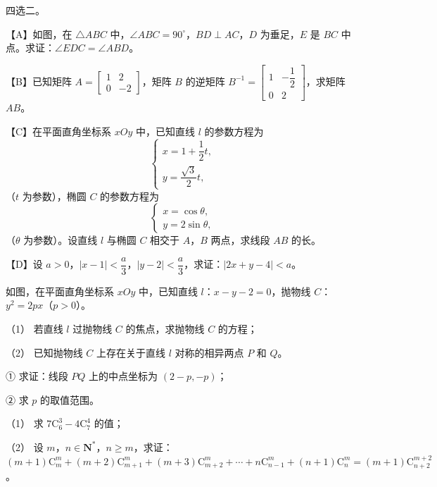 \begin{question}
四选二。

【A】如图，在 \(\triangle ABC\) 中，\(\angle ABC=90^{\circ}\)，\(BD\perp AC\)，\(D\) 为垂足，\(E\) 是 \(BC\) 中点。求证：\(\angle EDC=\angle ABD\)。
\nopagebreak[4]
\begin{center}\end{center}
\nopagebreak[4]
【B】已知矩阵 $A=\begin{bmatrix}1&2\\0&-2\end{bmatrix}$，矩阵 \(B\) 的逆矩阵 $B^{-1}=\begin{bmatrix}1&-\dfrac{1}{2}\\0&2\end{bmatrix}$，求矩阵 \(AB\)。

【C】在平面直角坐标系 \(xOy\) 中，已知直线 \(l\) 的参数方程为
\nopagebreak[4]
\[
\begin{cases}
x=1+\dfrac{1}{2}t,\\
y=\dfrac{\sqrt{3}}{2}t,
\end{cases}
\]
（\(t\) 为参数），椭圆 \(C\) 的参数方程为
\nopagebreak[4]
\[
\begin{cases}
x=\cos\theta,\\
y=2\sin\theta,
\end{cases}
\]
（\(\theta\) 为参数）。设直线 \(l\) 与椭圆 \(C\) 相交于 \(A\)，\(B\) 两点，求线段 \(AB\) 的长。

【D】设 \(a>0\)，\(|x-1|<\dfrac{a}{3}\)，\(|y-2|<\dfrac{a}{3}\)，求证：\(|2x+y-4|<a\)。

\Needspace{0.4\textheight}
\end{question}
\begin{question}
如图，在平面直角坐标系 \(xOy\) 中，已知直线 \(l\)：\(x-y-2=0\)，抛物线 \(C\)：\(y^{2}=2px\)（\(p>0\)）。

（1） 若直线 \(l\) 过抛物线 \(C\) 的焦点，求抛物线 \(C\) 的方程；

（2） 已知抛物线 \(C\) 上存在关于直线 \(l\) 对称的相异两点 \(P\) 和 \(Q\)。

① 求证：线段 \(PQ\) 上的中点坐标为 \((2-p,-p)\)；

② 求 \(p\) 的取值范围。
\nopagebreak[4]
\begin{center}\end{center}
\nopagebreak[4]
\end{question}
\begin{question}
（1） 求 \(7\mathrm{C}_6^3-4\mathrm{C}_7^4\) 的值；

（2） 设 \(m\)，\(n\in\mathbf{N}^{*}\)，\(n\geqslant m\)，求证：\((m+1)\mathrm{C}_m^m+(m+2)\mathrm{C}_{m+1}^m+(m+3)\mathrm{C}_{m+2}^m+\cdots+n\mathrm{C}_{n-1}^m+(n+1)\mathrm{C}_n^m=(m+1)\mathrm{C}_{n+2}^{m+2}\)。

\end{question}